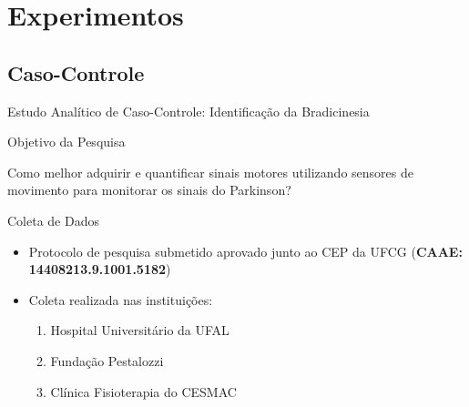 \documentclass{beamer}
\begin{document}



\section{Experimentos}
\subsection{Caso-Controle}
\begin{frame}{Estudo Analítico de Caso-Controle: Identificação da Bradicinesia} 
    \begin{block}{Objetivo da Pesquisa}

    
    Como melhor adquirir e quantificar sinais motores utilizando sensores de movimento para monitorar os sinais do Parkinson?

    \end{block}
		\begin{block}{Coleta de Dados}
			\begin{itemize}
				\item Protocolo de pesquisa submetido aprovado junto ao CEP da UFCG (\textbf{CAAE: 14408213.9.1001.5182})
				\item Coleta realizada nas instituições:
					\begin{enumerate}
						\item Hospital Universitário da UFAL
						\item Fundação Pestalozzi
						\item Clínica Fisioterapia do CESMAC
				\end{enumerate}				
			\end{itemize}
    \end{block}
\end{frame}
\end{document}
